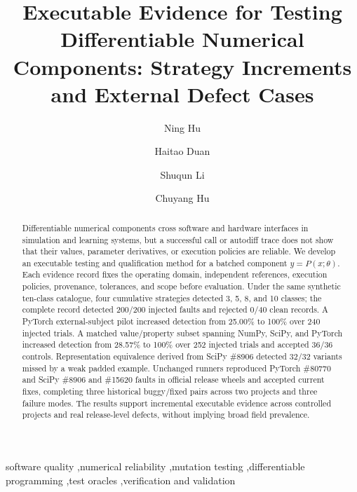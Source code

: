 \documentclass[preprint,12pt]{elsarticle}
\begin{document}
\begin{frontmatter}
\title{Executable Evidence for Testing Differentiable Numerical Components: Strategy Increments and External Defect Cases}
\author[mech]{Ning Hu}
\author[cs]{Haitao Duan}
\author[math]{Shuqun Li}
\author[ucsc]{Chuyang Hu}
\address[mech]{School of Mechanical Engineering, Hangzhou Dianzi University, No. 1158, 2nd Street, Qiantang District, Hangzhou 310018, Zhejiang, China}
\address[cs]{School of Computer Science, Hangzhou Dianzi University, No. 1158, 2nd Street, Qiantang District, Hangzhou 310018, Zhejiang, China}
\address[math]{School of Mathematics and Physics, Xi'an Jiaotong--Liverpool University, 111 Ren'ai Road, Suzhou Industrial Park, Suzhou 215123, Jiangsu, China}
\address[ucsc]{Department of Computer Science and Engineering, University of California, 1156 High Street, Santa Cruz, CA 95064, USA}

\begin{abstract}
Differentiable numerical components cross software and hardware interfaces in simulation and learning systems, but a successful call or autodiff trace does not show that their values, parameter derivatives, or execution policies are reliable. We develop an executable testing and qualification method for a batched component $y=P(x;\theta)$. Each evidence record fixes the operating domain, independent references, execution policies, provenance, tolerances, and scope before evaluation. Under the same synthetic ten-class catalogue, four cumulative strategies detected 3, 5, 8, and 10 classes; the complete record detected 200/200 injected faults and rejected 0/40 clean records. A PyTorch external-subject pilot increased detection from 25.00\% to 100\% over 240 injected trials. A matched value/property subset spanning NumPy, SciPy, and PyTorch increased detection from 28.57\% to 100\% over 252 injected trials and accepted 36/36 controls. Representation equivalence derived from SciPy \#8906 detected 32/32 variants missed by a weak padded example. Unchanged runners reproduced PyTorch \#80770 and SciPy \#8906 and \#15620 faults in official release wheels and accepted current fixes, completing three historical buggy/fixed pairs across two projects and three failure modes. The results support incremental executable evidence across controlled projects and real release-level defects, without implying broad field prevalence.
\end{abstract}

\begin{keyword}
software quality \sep numerical reliability \sep mutation testing \sep differentiable programming \sep test oracles \sep verification and validation
\end{keyword}
\end{frontmatter}
\end{document}

